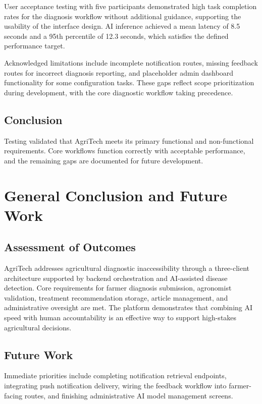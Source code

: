 \documentclass[12pt]{article}
\begin{document}
User acceptance testing with five participants demonstrated high task completion rates for the diagnosis workflow without additional guidance, supporting the usability of the interface design. AI inference achieved a mean latency of 8.5 seconds and a 95th percentile of 12.3 seconds, which satisfies the defined performance target.

Acknowledged limitations include incomplete notification routes, missing feedback routes for incorrect diagnosis reporting, and placeholder admin dashboard functionality for some configuration tasks. These gaps reflect scope prioritization during development, with the core diagnostic workflow taking precedence.

\subsection{Conclusion}
Testing validated that AgriTech meets its primary functional and non-functional requirements. Core workflows function correctly with acceptable performance, and the remaining gaps are documented for future development.

\newpage
\section{General Conclusion and Future Work}

\subsection{Assessment of Outcomes}
AgriTech addresses agricultural diagnostic inaccessibility through a three-client architecture supported by backend orchestration and AI-assisted disease detection. Core requirements for farmer diagnosis submission, agronomist validation, treatment recommendation storage, article management, and administrative oversight are met. The platform demonstrates that combining AI speed with human accountability is an effective way to support high-stakes agricultural decisions.

\subsection{Future Work}
Immediate priorities include completing notification retrieval endpoints, integrating push notification delivery, wiring the feedback workflow into farmer-facing routes, and finishing administrative AI model management screens.
\end{document}
